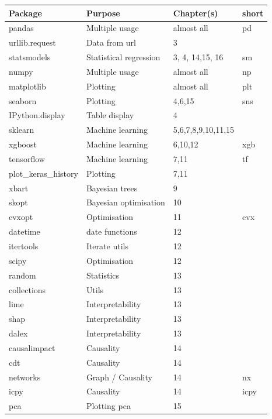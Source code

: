 \bigskip\noindent
\begin{tabular}{p{}p{}p{}p{}}
\toprule
Package & Purpose & Chapter(s) & short \\
\hline
pandas & Multiple usage & almost all & pd \\
urllib.request & Data from url & 3 &  \\
statsmodels & Statistical regression & 3, 4, 14,15, 16 & sm \\
numpy & Multiple usage & almost all & np \\
matplotlib & Plotting & almost all & plt \\
seaborn & Plotting & 4,6,15 & sns \\
IPython.display & Table display & 4 &  \\
sklearn & Machine learning & 5,6,7,8,9,10,11,15 &  \\
xgboost & Machine learning & 6,10,12 & xgb \\
tensorflow & Machine learning & 7,11 & tf \\
plot\_keras\_history & Plotting & 7,11 &  \\
xbart & Bayesian trees & 9 &  \\
skopt & Bayesian optimisation & 10 &  \\
cvxopt & Optimisation & 11 & cvx \\
datetime & date functions & 12 &  \\
itertools & Iterate utils & 12 &  \\
scipy & Optimisation & 12 &  \\
random & Statistics & 13 &  \\
collections & Utils & 13 &  \\
lime & Interpretability & 13 &  \\
shap & Interpretability & 13 &  \\
dalex & Interpretability & 13 &  \\
causalimpact & Causality & 14 &  \\
cdt & Causality & 14 &  \\
networks & Graph / Causality & 14 & nx \\
icpy & Causality & 14 & icpy \\
pca & Plotting pca & 15 &  \\
\bottomrule
\end{tabular}

\bigskip

